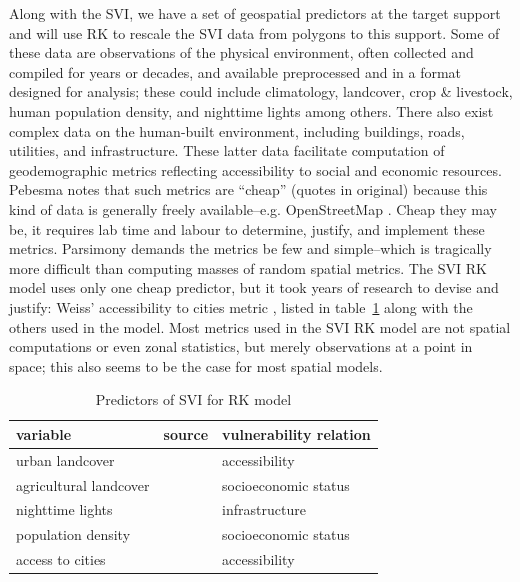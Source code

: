 \documentclass[]{interact}
\theoremstyle{plain}%
\theoremstyle{definition}
\theoremstyle{remark}
\begin{document}
Along with the SVI, we have a set of geospatial predictors at the target support and will use RK to rescale the SVI data from polygons to this support.  Some of these data are observations of the physical environment, often collected and compiled for years or decades, and available preprocessed and in a format designed for analysis; these could include climatology, landcover, crop \& livestock, human population density, and nighttime lights among others.  There also exist complex data on the human-built environment, including buildings, roads, utilities, and infrastructure.  These latter data facilitate computation of geodemographic metrics reflecting accessibility to social and economic resources.  Pebesma \citep{pebesma06} notes that such metrics are ``cheap'' (quotes in original) because this kind of data is generally freely available--e.g. OpenStreetMap \citep{osm}.  Cheap they may be, it requires lab time and labour to determine, justify, and implement these metrics.  Parsimony demands the metrics be few and simple--which is tragically more difficult than computing masses of random spatial metrics.  The SVI RK model uses only one cheap predictor, but it took years of research to devise and justify: Weiss' accessibility to cities metric \citep{weiss18}, listed in table~\ref{tab:predictors} along with the others used in the model.  Most metrics used in the SVI RK model are not spatial computations or even zonal statistics, but merely observations at a point in space; this also seems to be the case for most spatial models.

\begin{table}
  \begin{tabular}{l p{5cm} l}
    \hline
    \bf{variable} & \bf{source} & \bf{vulnerability relation} \\
    \hline
    urban landcover & \citep{basevue13} & accessibility \\
    agricultural landcover & \citep{basevue13} & socioeconomic status \\
    nighttime lights & \citep{elvidge17} & infrastructure \\
    population density & \citep{landscan} & socioeconomic status \\
    access to cities & \citep{weiss18} & accessibility \\
    \hline
  \end{tabular}
  \caption{Predictors of SVI for RK model} \label{tab:predictors}
\end{table}
\end{document}

